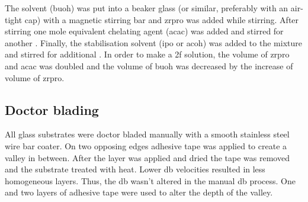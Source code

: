 The solvent (\gls{buoh}) was put into a beaker glass (or similar, preferably with an 
air-tight cap) with a magnetic stirring bar and \gls{zrpro} was added while stirring. After 
stirring  one mole equivalent chelating agent (\gls{acac}) was 
added and stirred for another . Finally, the stabilisation 
solvent\cite{Hu2016} (\gls{ipo} or \gls{acoh}) was added to the mixture and stirred for 
additional . 
In order to make a \gls{2f} solution, the volume of \gls{zrpro} and \gls{acac} was 
doubled and the volume of \gls{buoh} was decreased by the increase of volume of \gls{zrpro}. 

\subsection{Doctor blading}
\label{sec:exp-db}
All glass substrates were doctor bladed manually with a smooth stainless steel wire bar 
coater. On two opposing edges adhesive tape was applied to create a valley in between. After the 
layer was applied and dried the tape was removed and the substrate treated with heat.
Lower \gls{db} velocities resulted in less homogeneous layers.
Thus, the \gls{db} wasn't altered in the manual \gls{db} process. 
One and two layers of adhesive tape were used to alter the depth of the valley. 

